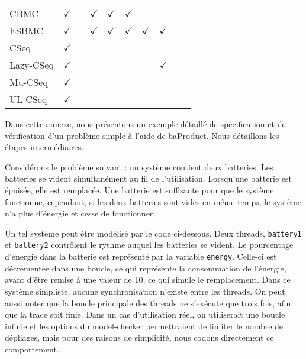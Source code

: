 \begin{landscape}
\begin{table}[ht]
\begin{tabular}{|l|c|c|c|c|c|c|c|c|c|}
CBMC       & $\checkmark$ &              & $\checkmark$ & $\checkmark$ & $\checkmark$ &              &              &              &                \\
ESBMC      & $\checkmark$ &              & $\checkmark$ & $\checkmark$ & $\checkmark$ & $\checkmark$ & $\checkmark$ &              &                \\
CSeq       & $\checkmark$ &              &              &              &              &              &              &              &                \\
Lazy-CSeq  & $\checkmark$ &              &              &              &              &              & $\checkmark$ &              &                \\
Mu-CSeq    & $\checkmark$ &              &              &              &              &              &              &              &                \\
UL-CSeq    & $\checkmark$ &              &              &              &              &              &              &              &                \\ \hline
\end{tabular}
\label{tab:prop_type_table}
\end{table}

\end{landscape}




Dans cette annexe, nous présentons un exemple détaillé de spécification et de
vérification d'un problème simple à l'aide de baProduct. Nous détaillons les
étapes intermédiaires.

Considérons le problème suivant : un système contient deux batteries. Les
batteries se vident simultanément au fil de l'utilisation. Lorsqu'une batterie
est épuisée, elle est remplacée. Une batterie est suffisante pour que le système
fonctionne, cependant, si les deux batteries sont vides en même temps, le
système n'a plus d'énergie et cesse de fonctionner.

Un tel système peut être modélisé par le code ci-dessous. Deux threads,
\texttt{battery1} et \texttt{battery2} contrôlent le rythme auquel les
batteries se vident. Le pourcentage d'énergie dans la batterie est représenté
par la variable \texttt{energy}. Celle-ci est décrémentée dans une
boucle, ce qui représente la consommation de l'énergie, avant d'être remise à
une valeur de 10, ce qui simule le remplacement. Dans ce système simpliste,
aucune synchronisation n'existe entre les threads.
On peut aussi noter que la boucle principale des threads ne s'exécute que trois
fois, afin que la trace soit finie. Dans un cas d'utilisation réel, on
utiliserait une boucle infinie et les options du model-checker permettraient de
limiter le nombre de dépliages, mais pour des raisons de simplicité, nous codons
directement ce comportement.

